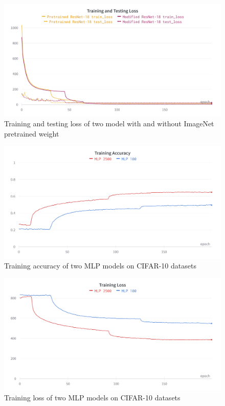 \documentclass[twocolumn]{extarticle}
\begin{document}
\begin{appendices}
\begin{figure}[H]
\centering
\includegraphics[width=0.9\linewidth]{charts/resnet-18-cifar-10-pretrained-loss}
\caption{Training and testing loss of two model with and without ImageNet pretrained weight}
\label{chart:resnet-18-cifar-10-pretrained-loss}
\end{figure}

\begin{figure}[H]
\centering
\includegraphics[width=0.9\linewidth]{charts/mlp_cifar_10_train_acc}
\caption{Training accuracy of two MLP models on CIFAR-10 datasets}
\label{chart: mlp_1}
\end{figure}

\begin{figure}[H]
\centering
\includegraphics[width=0.9\linewidth]{charts/mlp_cifar_10_train_loss}
\caption{Training loss of two MLP models on CIFAR-10 datasets}
\label{chart: mlp_2}
\end{figure}


\end{appendices}
\end{document}
